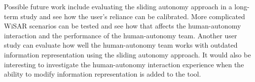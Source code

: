 Possible future work include evaluating the sliding autonomy approach in a long-term study and see how the user's reliance can be calibrated. More complicated WiSAR scenarios can be tested and see how that affects the human-autonomy interaction and the performance of the human-autonomy team. Another user study can evaluate how well the human-autonomy team works with outdated information representation using the sliding autonomy approach. It would also be interesting to investigate the human-autonomy interaction experience when the ability to modify information representation is added to the tool.
